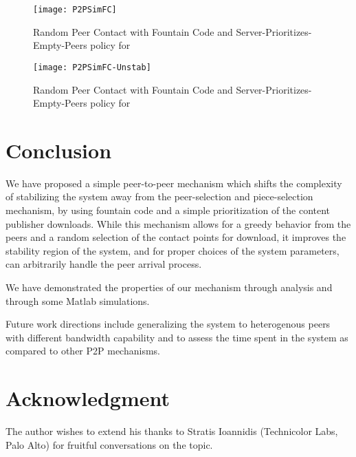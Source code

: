 \documentclass[11pt,conference]{IEEEtran}
\begin{document}
\begin{figure}[!t]
\centering
\texttt{[image: P2PSimFC]}
\caption{Random Peer Contact with Fountain Code and Server-Prioritizes-Empty-Peers policy for }
\label{fig:p2psimfc}
\end{figure}


\begin{figure}[!t]
\centering
\texttt{[image: P2PSimFC-Unstab]}
\caption{Random Peer Contact with Fountain Code and Server-Prioritizes-Empty-Peers policy for }
\label{fig:p2psimfc-unstab}
\end{figure}

\section{Conclusion}
\label{sec:con}

We have proposed a simple peer-to-peer mechanism which shifts the complexity of stabilizing the system away from the peer-selection and piece-selection mechanism, by using fountain code and a simple prioritization of the content publisher downloads. While this mechanism allows for a greedy behavior from the peers and a random selection of the contact points for download, it improves the stability region of the system, and for proper choices of the system parameters, can arbitrarily handle the peer arrival process.

We have demonstrated the properties of our mechanism through analysis and through some Matlab simulations.

Future work directions include generalizing the system to heterogenous peers with different bandwidth capability and to assess the time spent in the system as compared to other P2P mechanisms.







\section*{Acknowledgment}

The author wishes to extend his thanks to Stratis Ioannidis (Technicolor Labs, Palo Alto) for fruitful conversations on the topic.









\end{document}
